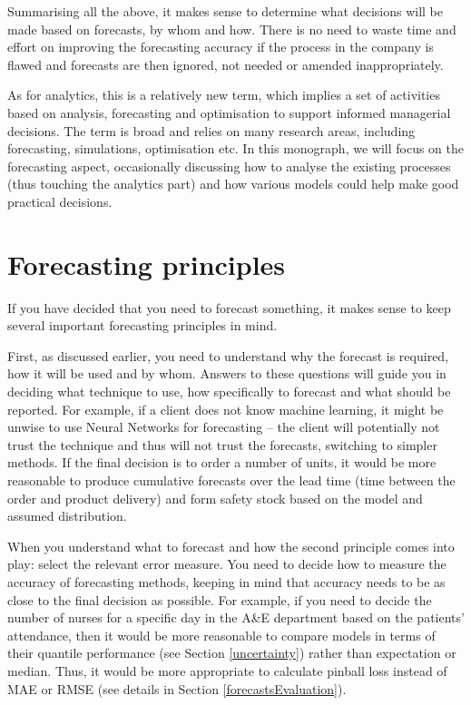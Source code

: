 \documentclass[]{book}
\theoremstyle{definition}
\theoremstyle{definition}
\theoremstyle{definition}
\theoremstyle{definition}
\theoremstyle{remark}
\begin{document}
Summarising all the above, it makes sense to determine what decisions will be made based on forecasts, by whom and how. There is no need to waste time and effort on improving the forecasting accuracy if the process in the company is flawed and forecasts are then ignored, not needed or amended inappropriately.

As for analytics, this is a relatively new term, which implies a set of activities based on analysis, forecasting and optimisation to support informed managerial decisions. The term is broad and relies on many research areas, including forecasting, simulations, optimisation etc. In this monograph, we will focus on the forecasting aspect, occasionally discussing how to analyse the existing processes (thus touching the analytics part) and how various models could help make good practical decisions.

\hypertarget{forecastingPrinciples}{%
\section{Forecasting principles}\label{forecastingPrinciples}}

If you have decided that you need to forecast something, it makes sense to keep several important forecasting principles in mind.

First, as discussed earlier, you need to understand why the forecast is required, how it will be used and by whom. Answers to these questions will guide you in deciding what technique to use, how specifically to forecast and what should be reported. For example, if a client does not know machine learning, it might be unwise to use Neural Networks for forecasting -- the client will potentially not trust the technique and thus will not trust the forecasts, switching to simpler methods. If the final decision is to order a number of units, it would be more reasonable to produce cumulative forecasts over the lead time (time between the order and product delivery) and form safety stock based on the model and assumed distribution.

When you understand what to forecast and how the second principle comes into play: select the relevant error measure. You need to decide how to measure the accuracy of forecasting methods, keeping in mind that accuracy needs to be as close to the final decision as possible. For example, if you need to decide the number of nurses for a specific day in the A\&E department based on the patients' attendance, then it would be more reasonable to compare models in terms of their quantile performance (see Section \ref{uncertainty}) rather than expectation or median. Thus, it would be more appropriate to calculate pinball loss instead of MAE or RMSE (see details in Section \ref{forecastsEvaluation}).
\end{document}
